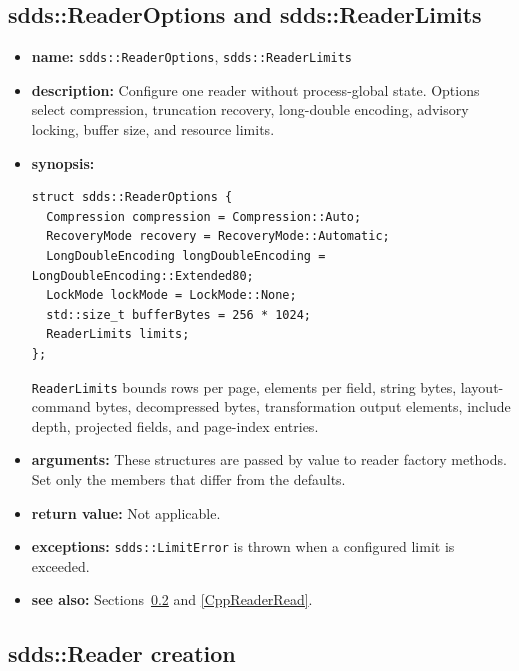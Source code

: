\documentclass[11pt]{article}
\begin{document}
\subsection{sdds::ReaderOptions and sdds::ReaderLimits}
\label{CppReaderOptions}

\begin{itemize}
\item {\bf name:}\newline
{\tt sdds::ReaderOptions}, {\tt sdds::ReaderLimits}
\item {\bf description:}\newline
Configure one reader without process-global state.  Options select compression,
truncation recovery, long-double encoding, advisory locking, buffer size, and
resource limits.
\item {\bf synopsis:}
\begin{verbatim}
struct sdds::ReaderOptions {
  Compression compression = Compression::Auto;
  RecoveryMode recovery = RecoveryMode::Automatic;
  LongDoubleEncoding longDoubleEncoding = LongDoubleEncoding::Extended80;
  LockMode lockMode = LockMode::None;
  std::size_t bufferBytes = 256 * 1024;
  ReaderLimits limits;
};
\end{verbatim}
{\tt ReaderLimits} bounds rows per page, elements per field, string bytes,
layout-command bytes, decompressed bytes, transformation output elements,
include depth, projected fields, and page-index entries.
\item {\bf arguments:}\newline
These structures are passed by value to reader factory methods.  Set only the
members that differ from the defaults.
\item {\bf return value:}\newline
Not applicable.
\item {\bf exceptions:}\newline
{\tt sdds::LimitError} is thrown when a configured limit is exceeded.
\item {\bf see also:}\newline
Sections~\ref{CppReaderCreate} and \ref{CppReaderRead}.
\end{itemize}

\subsection{sdds::Reader creation}
\label{CppReaderCreate}
\end{document}
